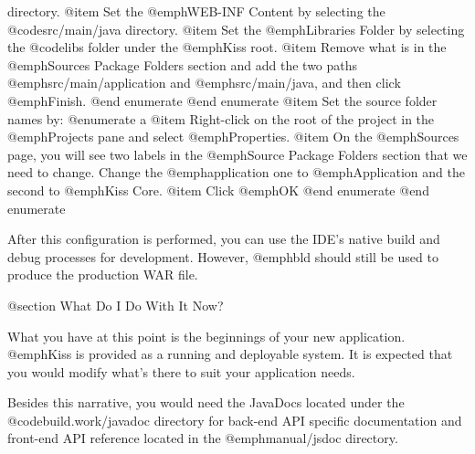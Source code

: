 directory.
@item
Set the @emph{WEB-INF Content} by selecting the @code{src/main/java} directory.
@item
Set the @emph{Libraries Folder} by selecting the @code{libs} folder
under the @emph{Kiss} root.
@item
Remove what is in the @emph{Sources Package Folders} section and add the two paths
@emph{src/main/application} and @emph{src/main/java}, and then click @emph{Finish}.
@end enumerate
@end enumerate
@item
Set the source folder names by:
@enumerate a
@item
Right-click on the root of the project in the @emph{Projects} pane and
select @emph{Properties}.
@item
On the @emph{Sources} page, you will see two labels in the
@emph{Source Package Folders} section that we need to change.  Change
the @emph{application} one to @emph{Application} and the second to @emph{Kiss Core}.
@item
Click @emph{OK}
@end enumerate
@end enumerate


After this configuration is performed, you can use the IDE's native
build and debug processes for development.  However, @emph{bld} should
still be used to produce the production WAR file.


@section What Do I Do With It Now?

What you have at this point is the beginnings of your new application.
@emph{Kiss} is provided as a running and deployable system.  It is
expected that you would modify what's there to suit your application
needs.

Besides this narrative, you would need the JavaDocs located under the
@code{build.work/javadoc} directory for back-end API specific documentation and
front-end API reference located in the @emph{manual/jsdoc} directory.
